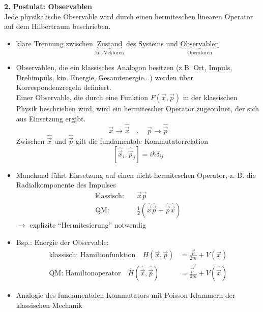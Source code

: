 \documentclass[10pt,article,colorback,accentcolor=tud9d]{scrartcl}
\begin{document}
  \noindent\textbf{2. Postulat: Observablen}\\
    Jede physikalische Observable wird durch einen hermiteschen linearen Operator auf dem Hilbertraum beschrieben. 
    \begin{itemize}
      \item klare Trennung zwischen $\underbrace{\text{Zustand}}_{\text{ket-Vektoren}}$ des Systems und $\underbrace{\text{Observablen}}_{\text{Operatoren}}$
      \item Observablen, die ein klassisches Analogon besitzen (z.B. Ort, Impuls, Drehimpuls, kin. Energie, Gesamtenergie...) werden über Korrespondenzregeln definiert. \\
        Einer Observable, die durch eine Funktion $F(\vec{x},\vec{p})$ in der klassischen Physik beschrieben wird, wird ein hermitescher Operator zugeordnet, der sich aus Einsetzung ergibt. 
        $$
        \vec{x} \rightarrow \hat{\vec{x}} \quad, \quad \vec{p} \rightarrow \hat{\vec{p}}
        $$
        Zwischen $\hat{\vec{x}}$ und $\hat{\vec{p}}$ gilt die fundamentale Kommutatorrelation
        \begin{equation}
        \left[\hat{\vec{x}}_i, \hat{\vec{p}}_j\right]=i\hbar\delta_{ij}
        \end{equation}
      \item Manchmal führt Einsetzung auf einen nicht hermiteschen Operator, z. B. die Radialkomponente des Impulses
        \begin{equation}
        \begin{aligned}
          \text{klassisch:} \quad &\vec{x}\vec{p}\\
          \text{QM:} \quad &\frac{1}{2}\left(\hat{\vec{x}}\hat{\vec{p}}+\hat{\vec{p}}\hat{\vec{x}}\right)
        \end{aligned}
        \end{equation}
        $\rightarrow$ explizite "`Hermitesierung"' notwendig
      \item Bsp.: Energie der Observable:
        \begin{equation}
        \begin{aligned}
          \text{klassisch: Hamiltonfunktion} \quad H(\vec{x},\vec{p})&=\frac{\vec{p}}{2m} + V(\vec{x})\\
          \text{QM: Hamiltonoperator} \quad \hat{H}(\hat{\vec{x}},\hat{\vec{p}})&=\frac{\hat{\vec{p}}^2}{2m}+V(\hat{\vec{x}})
        \end{aligned}
        \end{equation}
      \item Analogie des fundamentalen Kommutators mit Poisson-Klammern der klassischen Mechanik

\end{itemize}
\end{document}

